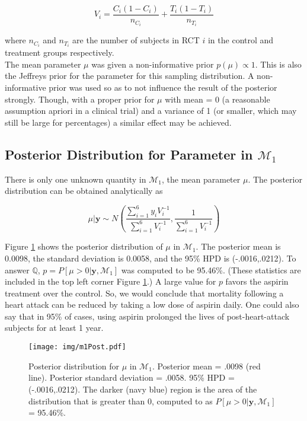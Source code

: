 \documentclass{../../tex_template/asaproc}
\newcommand{\p}[1]{\left(#1\right)}
\newcommand{\bk}[1]{\left[#1\right]}
\newcommand{\M}{\mathcal{M}}
\newcommand{\Q}{\mathbb{Q}}
\begin{document}
$$
V_i = \frac{C_i(1-C_i)}{n_{C_i}} + \frac{T_i(1-T_i)}{n_{T_i}}
$$

where $n_{C_i}$ and $n_{T_i}$ are the number of subjects in RCT $i$ in the
control and treatment groups respectively.\\

The mean parameter $\mu$ was given a non-informative prior $p(\mu) \propto 1$.
This is also the Jeffreys prior for the parameter for this sampling
distribution. A non-informative prior was used so as to not influence the
result of the posterior strongly. Though, with a proper prior for $\mu$ with
mean = 0 (a reasonable assumption apriori in a clinical trial) and a variance
of 1 (or smaller, which may still be large for percentages) a similar effect may
be achieved.\\

\subsection{Posterior Distribution for Parameter in $\M_1$}
There is only one unknown quantity in $\M_1$, the mean parameter $\mu$. 
The posterior distribution can be obtained analytically as

$$
\mu | \bm{y} \sim N\p{\frac{\sum_{i=1}^6 y_iV_i^{-1}}{\sum_{i=1}^6V_i^{-1}},
                      \frac{1}{\sum_{i=1}^6V_i^{-1}}}
$$

Figure \ref{fig:m1Post} shows the posterior distribution of $\mu$ in $\M_1$.
The posterior mean is 0.0098, the standard deviation is 0.0058, and the 95\%
HPD is (-.0016,.0212).  To answer $\Q$, $p=P\bk{\mu>0|\bm{y},\M_1}$ was
computed to be 95.46\%.  (These statistics are included in the top left corner
Figure \ref{fig:m1Post}.) A large value for $p$ favors the aspirin treatment
over the control.  So, we would conclude that mortality following a heart
attack can be reduced by taking a low dose of aspirin daily. One could also say
that in 95\% of cases, using aspirin prolonged the lives of post-heart-attack
subjects for at least 1 year.

\begin{figure}%
  \texttt{[image: img/m1Post.pdf]}
  \caption{\small Posterior distribution for $\mu$ in $\M_1$.  Posterior mean =
  .0098 (red line). Posterior standard deviation = .0058.  95\% HPD =
  (-.0016,.0212). The darker (navy blue) region is the area of the  distribution
  that is greater than 0, computed to as $P\bk{\mu>0|\bm{y},\M_1}$ = 95.46\%.}
  \label{fig:m1Post}
\end{figure}
\end{document}
